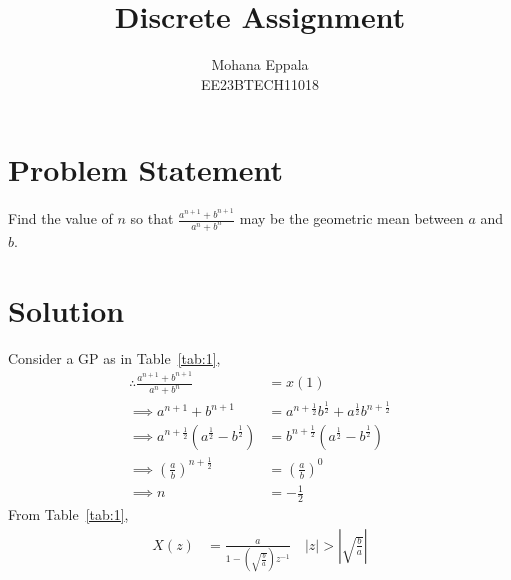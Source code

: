 \documentclass[12pt]{article}
\newcommand{\tabref}[1]{Table~\ref{#1}}
\providecommand{\abs}[1]{\left\vert#1\right\vert}
\begin{document}
\title{Discrete Assignment}
\author{Mohana Eppala\\ EE23BTECH11018}
\maketitle

\section*{Problem Statement}
Find the value of $n$ so that $\frac{a^{n+1} + b^{n+1}}{a^{n}+b^{n}}$ may be the geometric mean between $a$ and $b$.
\section*{Solution}
\fi
\begin{table}[H]

\end{table}

Consider a GP as in \tabref{tab:1},
\begin{align}
	\therefore \frac{a^{n+1} + b^{n+1}}{a^{n}+b^{n}} &= x(1) \\
	\implies a^{n+1} + b^{n+1} &= a^{n+\frac{1}{2}}b^{\frac{1}{2}} + a^{\frac{1}{2}}b^{n+\frac{1}{2}} \\
\implies a^{n+\frac{1}{2}}(a^{\frac{1}{2}} - b^{\frac{1}{2}}) &= b^{n+\frac{1}{2}}(a^{\frac{1}{2}} - b^{\frac{1}{2}}) \\
\implies (\frac{a}{b})^{n+\frac{1}{2}} &= (\frac{a}{b})^{0} \\
\implies n &= -\frac{1}{2}
\end{align}
From \tabref{tab:1},
\begin{align}
	X(z) &= \frac{a}{1-(\sqrt{\frac{b}{a}})z^{-1}} \quad \abs{z}>\abs{\sqrt{\frac{b}{a}}}
\end{align}
\end{document}
